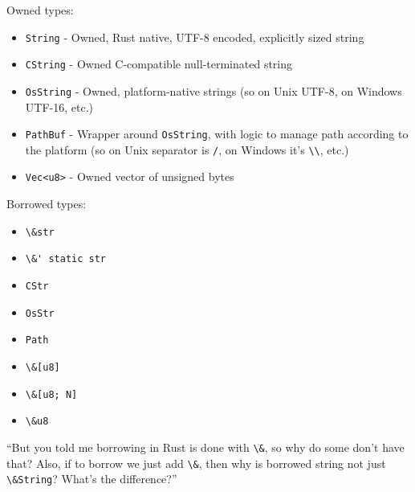 \documentclass[
  9pt,
  ignorenonframetext,
]{beamer}
\newcommand{\passthrough}[1]{#1}
\providecommand{\tightlist}{%
  \setlength{\itemsep}{0pt}\setlength{\parskip}{0pt}}
\begin{document}
\begin{frame}[fragile]
Owned types:

\begin{itemize}
\tightlist
\item
  \passthrough{\lstinline!String!} - Owned, Rust native, UTF-8 encoded,
  explicitly sized string
\item
  \passthrough{\lstinline!CString!} - Owned C-compatible null-terminated
  string
\item
  \passthrough{\lstinline!OsString!} - Owned, platform-native strings
  (so on Unix UTF-8, on Windows UTF-16, etc.)
\item
  \passthrough{\lstinline!PathBuf!} - Wrapper around
  \passthrough{\lstinline!OsString!}, with logic to manage path
  according to the platform (so on Unix separator is
  \passthrough{\lstinline!/!}, on Windows it's
  \passthrough{\lstinline!\\!}, etc.)
\item
  \passthrough{\lstinline!Vec<u8>!} - Owned vector of unsigned bytes
\end{itemize}
\end{frame}

\begin{frame}[fragile]
Borrowed types:

\begin{itemize}
\tightlist
\item
  \passthrough{\lstinline!\&str!}
\item
  \passthrough{\lstinline!\&' static str!}
\item
  \passthrough{\lstinline!CStr!}
\item
  \passthrough{\lstinline!OsStr!}
\item
  \passthrough{\lstinline!Path!}
\item
  \passthrough{\lstinline!\&[u8]!}
\item
  \passthrough{\lstinline!\&[u8; N]!}
\item
  \passthrough{\lstinline!\&u8!}
\end{itemize}
\end{frame}

\begin{frame}[fragile]
``But you told me borrowing in Rust is done with
\passthrough{\lstinline!\&!}, so why do some don't have that? Also, if
to borrow we just add \passthrough{\lstinline!\&!}, then why is borrowed
string not just \passthrough{\lstinline!\&String!}? What's the
difference?''
\end{frame}
\end{document}
